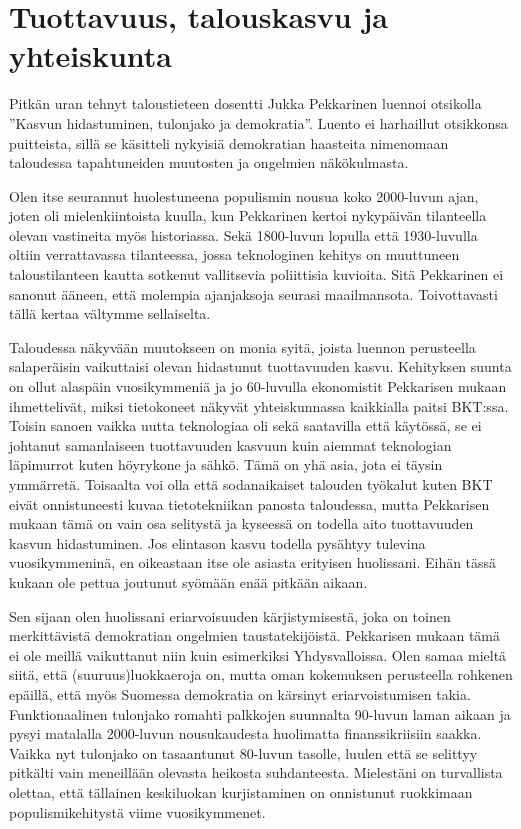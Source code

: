 \documentclass[12pt]{article}
\begin{document}
\newpage
\section{Tuottavuus, talouskasvu ja yhteiskunta}

Pitkän uran tehnyt taloustieteen dosentti Jukka Pekkarinen luennoi otsikolla
''Kasvun hidastuminen, tulonjako ja demokratia''. Luento ei harhaillut
otsikkonsa puitteista, sillä se käsitteli nykyisiä demokratian haasteita
nimenomaan taloudessa tapahtuneiden muutosten ja ongelmien näkökulmasta.

Olen itse seurannut huolestuneena populismin nousua koko 2000-luvun ajan, joten
oli mielenkiintoista kuulla, kun Pekkarinen kertoi nykypäivän tilanteella
olevan vastineita myös historiassa. Sekä 1800-luvun lopulla että 1930-luvulla
oltiin verrattavassa tilanteessa, jossa teknologinen kehitys on muuttuneen
taloustilanteen kautta sotkenut vallitsevia poliittisia kuvioita. Sitä
Pekkarinen ei sanonut ääneen, että molempia ajanjaksoja seurasi maailmansota.
Toivottavasti tällä kertaa vältymme sellaiselta.

Taloudessa näkyvään muutokseen on monia syitä, joista luennon perusteella
salaperäisin vaikuttaisi olevan hidastunut tuottavuuden kasvu. Kehityksen
suunta on ollut alaspäin vuosikymmeniä ja jo 60-luvulla ekonomistit Pekkarisen
mukaan ihmettelivät, miksi tietokoneet näkyvät yhteiskunnassa kaikkialla paitsi
BKT:ssa. Toisin sanoen vaikka uutta teknologiaa oli sekä saatavilla että
käytössä, se ei johtanut samanlaiseen tuottavuuden kasvuun kuin aiemmat
teknologian läpimurrot kuten höyrykone ja sähkö. Tämä on yhä asia, jota ei
täysin ymmärretä. Toisaalta voi olla että sodanaikaiset talouden työkalut kuten
BKT eivät onnistuneesti kuvaa tietotekniikan panosta taloudessa, mutta
Pekkarisen mukaan tämä on vain osa selitystä ja kyseessä on todella aito
tuottavuuden kasvun hidastuminen. Jos elintason kasvu todella pysähtyy tulevina
vuosikymmeninä, en oikeastaan itse ole asiasta erityisen huolissani. Eihän
tässä kukaan ole pettua joutunut syömään enää pitkään aikaan.

Sen sijaan olen huolissani eriarvoisuuden kärjistymisestä, joka on toinen
merkittävistä demokratian ongelmien taustatekijöistä. Pekkarisen mukaan tämä ei
ole meillä vaikuttanut niin kuin esimerkiksi Yhdysvalloissa. Olen samaa mieltä
siitä, että (suuruus)luokkaeroja on, mutta oman kokemuksen perusteella rohkenen
epäillä, että myös Suomessa demokratia on kärsinyt eriarvoistumisen takia.
Funktionaalinen tulonjako romahti palkkojen suunnalta 90-luvun laman aikaan ja
pysyi matalalla 2000-luvun nousukaudesta huolimatta finanssikriisiin saakka.
Vaikka nyt tulonjako on tasaantunut 80-luvun tasolle, luulen että se selittyy
pitkälti vain meneillään olevasta heikosta suhdanteesta. Mielestäni on
turvallista olettaa, että tällainen keskiluokan kurjistaminen on onnistunut
ruokkimaan populismikehitystä viime vuosikymmenet.
\end{document}
